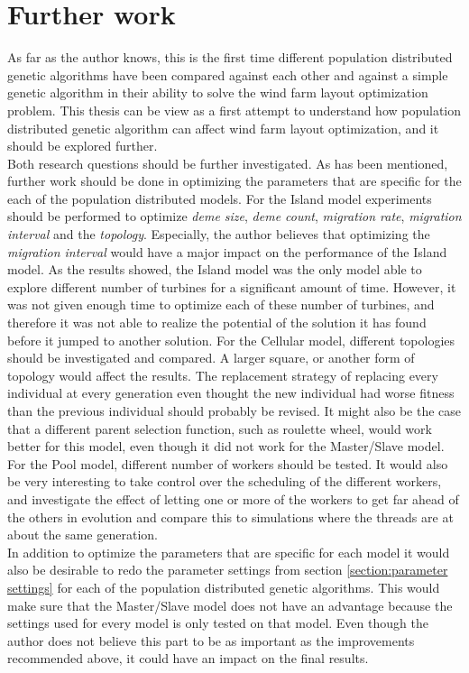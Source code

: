 \section{Further work}\label{section:further work}
As far as the author knows, this is the first time different population distributed genetic algorithms have been compared against each other and against a simple genetic algorithm in their ability to solve the wind farm layout optimization problem. This thesis can be view as a first attempt to understand how population distributed genetic algorithm can affect wind farm layout optimization, and it should be explored further.\\


\noindent Both research questions should be further investigated. As has been mentioned, further work should be done in optimizing the parameters that are specific for the each of the population distributed models. For the Island model experiments should be performed to optimize \textit{deme size}, \textit{deme count}, \textit{migration rate}, \textit{migration interval} and the \textit{topology}. Especially, the author believes that optimizing the \textit{migration interval} would have a major impact on the performance of the Island model. As the results showed, the Island model was the only model able to explore different number of turbines for a significant amount of time. However, it was not given enough time to optimize each of these number of turbines, and therefore it was not able to realize the potential of the solution it has found before it jumped to another solution. For the Cellular model, different topologies should be investigated and compared. A larger square, or another form of topology would affect the results. The replacement strategy of replacing every individual at every generation even thought the new individual had worse fitness than the previous individual should probably be revised. It might also be the case that a different parent selection function, such as roulette wheel, would work better for this model, even though it did not work for the Master/Slave model. For the Pool model, different number of workers should be tested. It would also be very interesting to take control over the scheduling of the different workers, and investigate the effect of letting one or more of the workers to get far ahead of the others in evolution and compare this to simulations where the threads are at about the same generation. \\


\noindent In addition to optimize the parameters that are specific for each model it would also be desirable to redo the parameter settings from section \ref{section:parameter settings} for each of the population distributed genetic algorithms. This would make sure that the Master/Slave model does not have an advantage because the settings used for every model is only tested on that model. Even though the author does not believe this part to be as important as the improvements  recommended above, it could have an impact on the final results. \\


